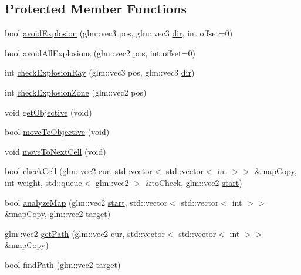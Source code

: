 \subsection*{Protected Member Functions}
\begin{DoxyCompactItemize}
\item 
bool \mbox{\hyperlink{class_game_1_1_component_1_1_i_a_a326ade34932f252ba16e75f40b769f1b}{avoid\+Explosion}} (glm\+::vec3 pos, glm\+::vec3 \mbox{\hyperlink{class_game_1_1_component_1_1_i_a_a4996d461d576a2ffff66e4b33d9d84e2}{dir}}, int offset=0)
\item 
bool \mbox{\hyperlink{class_game_1_1_component_1_1_i_a_a3a459eda48a6cd131da8164842250c43}{avoid\+All\+Explosions}} (glm\+::vec2 pos, int offset=0)
\item 
int \mbox{\hyperlink{class_game_1_1_component_1_1_i_a_a006b992ca7952c4977a04febbc19f882}{check\+Explosion\+Ray}} (glm\+::vec3 pos, glm\+::vec3 \mbox{\hyperlink{class_game_1_1_component_1_1_i_a_a4996d461d576a2ffff66e4b33d9d84e2}{dir}})
\item 
int \mbox{\hyperlink{class_game_1_1_component_1_1_i_a_ae6173c1d64a875181fe59b46ae609d91}{check\+Explosion\+Zone}} (glm\+::vec2 pos)
\item 
void \mbox{\hyperlink{class_game_1_1_component_1_1_i_a_a01c2575295fff1a6c3c0314d4edc0266}{get\+Objective}} (void)
\item 
bool \mbox{\hyperlink{class_game_1_1_component_1_1_i_a_a18e08cf56c2cd6a6d57aeb7eff48bb4c}{move\+To\+Objective}} (void)
\item 
void \mbox{\hyperlink{class_game_1_1_component_1_1_i_a_ac3951dbcb02fd5f34160becaad1bb962}{move\+To\+Next\+Cell}} (void)
\item 
bool \mbox{\hyperlink{class_game_1_1_component_1_1_i_a_afb045de0879ac649137bfac7c11e3c52}{check\+Cell}} (glm\+::vec2 cur, std\+::vector$<$ std\+::vector$<$ int $>$$>$ \&map\+Copy, int weight, std\+::queue$<$ glm\+::vec2 $>$ \&to\+Check, glm\+::vec2 \mbox{\hyperlink{class_game_1_1_component_1_1_i_a_ab440dc76a8837e291f6545e0dd15c819}{start}})
\item 
bool \mbox{\hyperlink{class_game_1_1_component_1_1_i_a_ace576ddf2bbb22b3a3462db04e99b8df}{analyze\+Map}} (glm\+::vec2 \mbox{\hyperlink{class_game_1_1_component_1_1_i_a_ab440dc76a8837e291f6545e0dd15c819}{start}}, std\+::vector$<$ std\+::vector$<$ int $>$$>$ \&map\+Copy, glm\+::vec2 target)
\item 
glm\+::vec2 \mbox{\hyperlink{class_game_1_1_component_1_1_i_a_addb635c6c68490214abd843fd07fdb12}{get\+Path}} (glm\+::vec2 cur, std\+::vector$<$ std\+::vector$<$ int $>$$>$ \&map\+Copy)
\item 
bool \mbox{\hyperlink{class_game_1_1_component_1_1_i_a_aa7027727099c16dc0727459382858631}{find\+Path}} (glm\+::vec2 target)
\end{DoxyCompactItemize}
